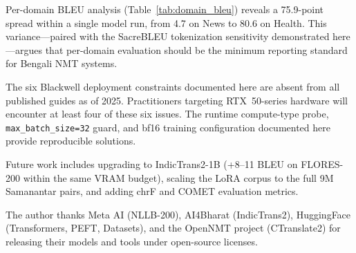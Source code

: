 \documentclass[sigconf]{acmart}
\begin{document}
Per-domain BLEU analysis (Table~\ref{tab:domain_bleu}) reveals a 75.9-point spread
within a single model run, from 4.7 on News to 80.6 on Health.
This variance---paired with the SacreBLEU tokenization sensitivity demonstrated
here---argues that per-domain evaluation should be the minimum reporting standard
for Bengali NMT systems.

The six Blackwell deployment constraints documented here are absent from all
published guides as of 2025.
Practitioners targeting RTX~50-series hardware will encounter at least four of
these six issues.
The runtime compute-type probe, \texttt{max\_batch\_size=32} guard, and bf16
training configuration documented here provide reproducible solutions.

Future work includes upgrading to IndicTrans2-1B (+8--11 BLEU on FLORES-200
within the same VRAM budget), scaling the LoRA corpus to the full 9M Samanantar
pairs, and adding chrF and COMET evaluation metrics.

\begin{acks}
The author thanks Meta AI (NLLB-200), AI4Bharat (IndicTrans2), HuggingFace
(Transformers, PEFT, Datasets), and the OpenNMT project (CTranslate2) for
releasing their models and tools under open-source licenses.
\end{acks}
\end{document}

